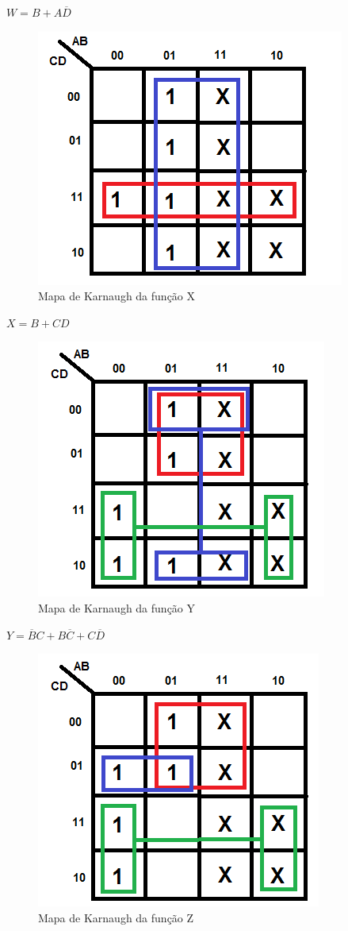 \documentclass[12pt]{article}
\begin{document}
$ W = B + A\overline{D}$

\begin{figure}[H]
	\centering
	\includegraphics[width=.5\textwidth]{mapakarnaughx.png}
	\caption{Mapa de Karnaugh da função X}
	\label{fig:karnaughx}
\end{figure}

$ X = B + CD$

\begin{figure}[H]
	\centering
	\includegraphics[width=.5\textwidth]{mapakarnaughy.png}
	\caption{Mapa de Karnaugh da função Y}
	\label{fig:karnaughy}
\end{figure}

$ Y = \overline{B}C + B\overline{C} + C\overline{D}$

\begin{figure}[H]
	\centering
	\includegraphics[width=.5\textwidth]{mapakarnaughz.png}
	\caption{Mapa de Karnaugh da função Z}
	\label{fig:karnaughz}
\end{figure}
\end{document}
